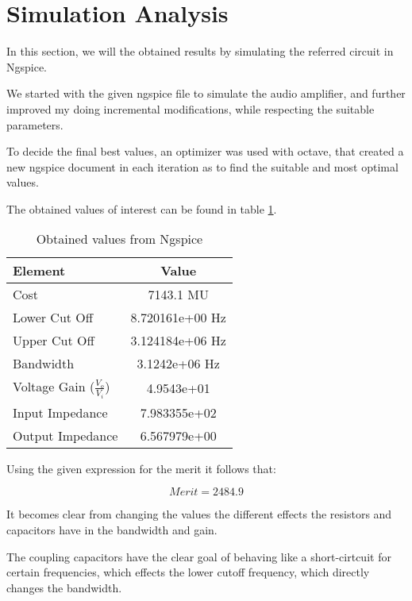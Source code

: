 \newpage

\section{Simulation Analysis}
\label{sec:simulation}

In this section, we will the obtained results by simulating the referred circuit in Ngspice. 

We started with the given ngspice file to simulate the audio amplifier, and further improved my doing incremental modifications, while respecting the suitable parameters.

To decide the final best values, an optimizer was used with octave, that created a new ngspice document in each iteration as to find the suitable and most optimal values.

The obtained values of interest can be found in table \ref{tab:sim1}.

\begin{table}[h]
    \centering
    \begin{tabular}{|l|c|}
    \hline
    {\bf Element } & {\bf Value} \\
    \hline \hline
    Cost & 7143.1 MU\\
    \hline
    Lower Cut Off & 8.720161e+00 Hz\\
    \hline
    Upper Cut Off & 3.124184e+06 Hz \\
    \hline
    Bandwidth & 3.1242e+06 Hz \\
    \hline
    Voltage Gain ($\frac{V_{o}}{V_{i}}$)  &  4.9543e+01 \\
    \hline
    Input Impedance & 7.983355e+02 \\
    \hline
    Output Impedance & 6.567979e+00 \\
    \hline 
    \end{tabular}
    \caption{Obtained values from Ngspice}
    \label{tab:sim1}
\end{table}


Using the given expression for the merit it follows that:

\begin{equation}
    Merit = 2484.9
    \label{eq:merit}
\end{equation}

It becomes clear from changing the values the different effects the resistors and capacitors have in the bandwidth and gain.

The coupling capacitors have the clear goal of behaving like a short-cirtcuit for certain frequencies, which effects the lower cutoff frequency, which directly changes the bandwidth.

